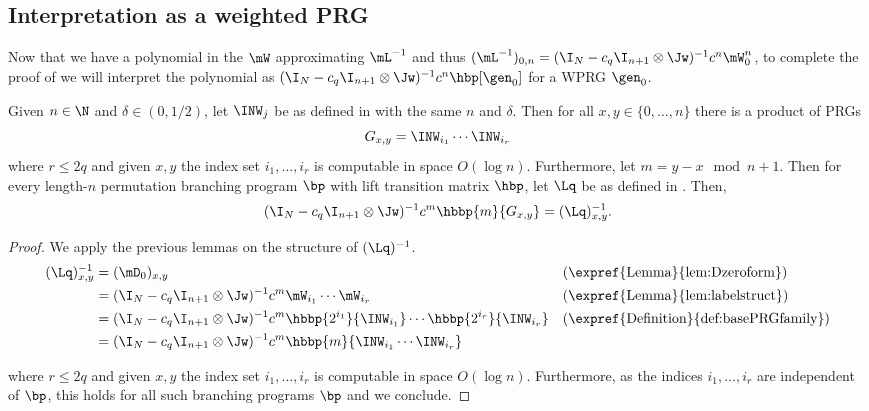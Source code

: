 \subsection{Interpretation as a weighted PRG}
Now that we have a polynomial in the %
$\mW$  %
approximating $\mL^{-1}$ and thus $(\mL^{-1})_{0,n}=(\I_N-c_q\I_{n+1}\otimes\Jw)^{-1}c^n\mW_0^n$, to complete the proof of  we will interpret the polynomial as $(\I_N-c_q\I_{n+1}\otimes\Jw)^{-1}c^n\hbp[\gen_0]$ for a WPRG $\gen_0$.
\begin{lemma}\label{lem:baseG}
Given $n\in\N$ and $\delta \in (0,1/2)$, let $\INW_{j}$ be as defined in  with the same $n$ and $\delta$. Then for all $x,y \in \{0,\ldots,n\}$ there is a product of PRGs 
$$G_{x,y}=\INW_{i_1}\cdots\INW_{i_r}$$ 
where $r\leq 2q$ and given $x,y$ the index set $i_1,\dots,i_r$ is computable in space $O(\log n)$. Furthermore, let $m=y-x \mod n+1$. Then for every length-$n$ permutation branching program $\bp$ with lift transition matrix $\hbp$, let $\Lq$ be as defined in . Then,
$$ (\I_N-c_q\I_{n+1}\otimes\Jw )^{-1}c^m\hbbp{m}{G_{x,y}}=(\Lq)^{-1}_{x,y}.$$
\end{lemma}
\begin{proof}
We apply the previous lemmas on the structure of $(\Lq)^{-1}$. %
\begin{align*}
(\Lq)^{-1}_{x,y} &= (\mD_0)_{x,y} && \text{(\expref{Lemma}{lem:Dzeroform})}\\
&= (\I_N-c_q\I_{n+1}\otimes\Jw )^{-1}c^m\mW_{i_1}\cdots\mW_{i_r} && \text{(\expref{Lemma}{lem:labelstruct})}\\
&=(\I_N-c_q\I_{n+1}\otimes\Jw )^{-1}c^m \hbbp{2^{i_1}}{\INW_{i_1}}\cdots\hbbp{2^{i_r}}{\INW_{i_r}} && \text{(\expref{Definition}{def:basePRGfamily})}\\
&=(\I_N-c_q\I_{n+1}\otimes\Jw )^{-1}c^m\hbbp{m}{\INW_{i_1}\cdots\INW_{i_r}}
\end{align*}

where $r\leq 2q$ and given $x,y$ the index set $i_1,\dots,i_r$ is computable in space $O(\log n)$. Furthermore, as the indices $i_1,\dots,i_r$ are independent of $\bp$, this holds for all such branching programs $\bp$ and we conclude.
\end{proof}

